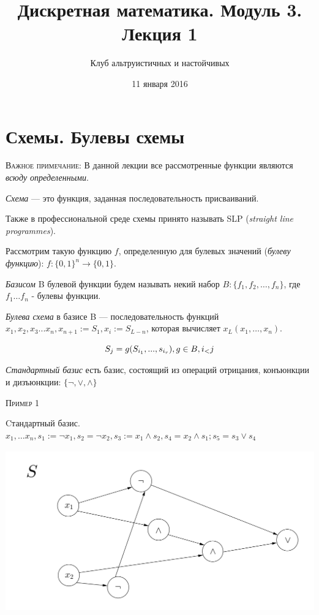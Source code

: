 \documentclass[a4paper, 12pt]{article}
\begin{document}
\title{Дискретная математика. Модуль 3. Лекция 1}
\author{Клуб альтруистичных и настойчивых}
\date{11 января 2016}

\maketitle
\section*{Схемы. Булевы схемы}
\textsc{Важное примечание:} В данной лекции все рассмотренные функции являются \textit{всюду определенными}.

\textit{Схема} --- это функция, заданная последовательность присваиваний.

Также в профессиональной среде схемы принято называть SLP (\textit{straight line programmes}). 

Рассмотрим такую функцию $f$, определенную для булевых значений (\textit{булеву функцию}): $f:\{0, 1\}^n \rightarrow \{0, 1\}$.

\textit{Базисом} B булевой функции будем называть некий набор $B:\{f_1, f_2, \ldots , f_n\}$, где $f_1 \ldots f_n$ - булевы функции.

\textit{Булева схема} в базисе B  --- последовательность функций $x_1, x_2, x_3... x_n, x_{n+1} := S_1, x_i := S_{L-n}$, которая вычисляет $x_L(x_1, \ldots ,x_n)$. 

\[S_j = g(S_{i_1},  ... , s_{i_r}), g \in B, i_\mathalpha < j\]

\textit{Стандартный базис} есть базис, состоящий из операций отрицания, конъюнкции и дизъюнкции: $\{\lnot, \vee, \wedge\}$

\textsc{Пример 1}

Cтандартный базис.
$x_1, \ldots x_n, s_1 := \lnot x_1, s_2 = \lnot x_2, s_3 := x_1 \wedge s_2, s_4 = x_2 \wedge s_1; s_5 = s_3 \vee s_4$

\includegraphics[height=7cm]{Images/1.png}
 
\end{document}
